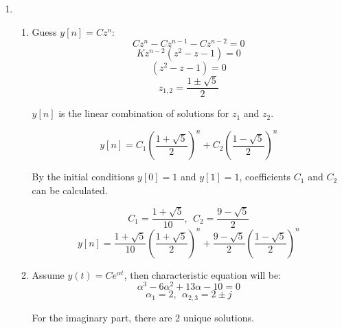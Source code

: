 \documentclass[10pt,a4paper, margin=1in]{article}
\begin{document}
\begin{enumerate}
\item %
    \begin{enumerate}   
    \item %
        Guess $y[n] = Cz^n$:
        \begin{equation*}
            Cz^n-Cz^{n-1}-Cz^{n-2} = 0
        \end{equation*}
        \begin{equation*}
            Kz^{n-2}(z^2-z-1) = 0
        \end{equation*}
        \begin{equation*}
            (z^2-z-1) = 0
        \end{equation*}
        \begin{equation*}
            z_{1,2} = \frac{1 \pm \sqrt{5}}{2}
        \end{equation*}
            
        $y[n]$ is the linear combination of solutions for $z_1$ and $z_2$.

        \begin{equation*}
            y[n] = C_1 \left ( \frac{1 + \sqrt{5}}{2} \right )^n + C_2 \left (\frac{1 - \sqrt{5}}{2} \right )^n
        \end{equation*}

        By the initial conditions $y[0] = 1$ and $y[1] = 1$, coefficients $C_1$ and $C_2$ can be calculated.

        \begin{equation*}
            C_1 = \frac{1 + \sqrt{5}}{10}, \ \ C_2 = \frac{9-\sqrt{5}}{2}
        \end{equation*}
        \begin{equation*}
            y[n] = \frac{1 + \sqrt{5}}{10}\left ( \frac{1 + \sqrt{5}}{2} \right )^n +\frac{9-\sqrt{5}}{2}\left (\frac{1 - \sqrt{5}}{2} \right )^n
        \end{equation*}
    \item %
        Assume $y(t) = Ce^{\alpha t}$, then characteristic equation will be:
        \begin{equation*}
            \alpha^3-6\alpha^2+13\alpha-10 = 0
        \end{equation*}
        \begin{equation*}
            \alpha_1 = 2, \ \ \alpha_{2,3} = 2 \pm j
        \end{equation*}

        For the imaginary part, there are 2 unique solutions.


\end{enumerate}
\end{enumerate}
\end{document}

